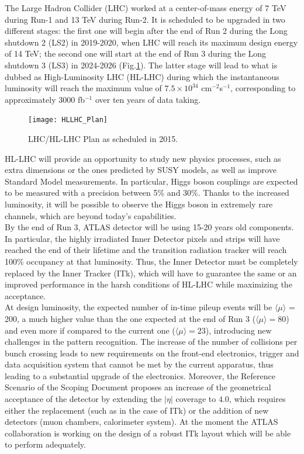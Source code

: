 \documentclass[a4paper,twoside,12pt]{book}
\begin{document}
The Large Hadron Collider (LHC) worked at a center-of-mass energy of 7 TeV during Run-1 and 13 TeV during Run-2. It is scheduled to be upgraded in two different stages: the first one will begin after the end of Run 2 during the Long shutdown 2 (LS2) in 2019-2020, when LHC will reach its maximum design energy of 14 TeV; the second one will start at the end of Run 3 during the Long shutdown 3 (LS3) in 2024-2026 (Fig.\ref{fig:HLLHC_Plan}). The latter stage will lead to what is dubbed as High-Luminosity LHC (HL-LHC) during which the
instantaneous luminosity will reach the maximum value of $7.5 \times 10^{34}$ cm$^{-2}$s$^{-1}$, corresponding to approximately 3000 fb$^{-1}$ over ten years of data taking. \\

\begin{figure} [h]
	\texttt{[image: HLLHC\_Plan]}
	\caption{LHC/HL-LHC Plan as scheduled in 2015\cite{scoping}.}
	\label{fig:HLLHC_Plan}
\end{figure}

HL-LHC will provide an opportunity to study new physics processes, such as extra dimensions or the ones predicted by SUSY models, as well as improve Standard Model measurements. In particular, Higgs boson 
couplings are expected to be measured with a precision between 5\% and 30\%\cite{loi}. Thanks to the increased luminosity, it will be possible to observe the Higgs boson in extremely
rare channels, which are beyond today's capabilities.\\

By the end of Run 3, ATLAS detector will be using 15-20 years old components. In particular,
the highly irradiated Inner Detector pixels and strips will have reached the end of their
lifetime and the transition radiation tracker will reach 100\% occupancy at that luminosity. Thus, the Inner Detector must be completely replaced by the Inner Tracker (ITk), which will
have to guarantee the same or an improved performance in the harsh conditions of HL-LHC while maximizing the acceptance. \\

At design luminosity, the expected number of in-time pileup events will be $\langle\mu\rangle$ = 200, a much
higher value than the one expected at the end of Run 3 ($\langle\mu\rangle = 80$) and even more if 
compared to the current one ($\langle\mu\rangle = 23$), introducing new challenges in the pattern
recognition. The increase of the number
of collisions per bunch crossing leads to new requirements on the front-end electronics, trigger and data acquisition system that cannot be met by the current apparatus, thus leading to a 
substantial upgrade of the electronics. Moreover, the Reference Scenario of the Scoping Document\cite{scoping} proposes an increase of the geometrical acceptance of the detector by extending the $|\eta|$ coverage to $4.0$, which requires either the replacement (such as in the case of ITk) or the addition of new detectors (muon chambers,
calorimeter system). 
At the moment the ATLAS collaboration is working on the design of a robust ITk layout which will be able to perform adequately.\\
\end{document}
